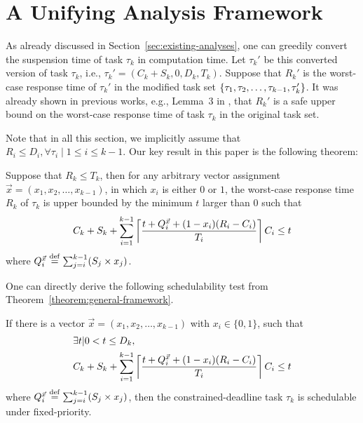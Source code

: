 \section{A Unifying Analysis Framework}
\label{sec:analysis}


As already discussed in Section~\ref{sec:existing-analyses}, one can greedily convert the suspension time of task $\tau_k$ in computation time. Let $\tau_k'$ be this converted version of task $\tau_k$, i.e., $\tau_k' = (C_k + S_k, 0, D_k, T_k)$.  Suppose that $R_k'$ is the worst-case response time of $\tau_k'$ in the modified task set $\left\{{\tau_1, \tau_2, \ldots, \tau_{k-1}, \tau_k'}\right\}$. It was already shown in previous works, e.g., Lemma~3 in
\cite{Liu_2014}, that $R_k'$ is a safe upper bound on the worst-case response time of task $\tau_k$ in the original task set.

Note that in all this section, we implicitly assume that $R_i
\leq D_i, \forall \tau_i \mid 1 \leq i \leq k-1$.  Our key result in
this paper is the following theorem:

\begin{theorem}
   \label{theorem:general-framework}
   Suppose that $R_k \leq T_k$, then for any arbitrary vector assignment $\vec{x} = (x_1, x_2, \ldots, x_{k-1})$, in which $x_i$ is either $0$ or $1$, the worst-case
   response time $R_k$ of $\tau_k$ is upper bounded by the minimum $t$ larger than $0$ such that 
   {\small \begin{equation} \label{eq:TDA-suspension-tighter0} 
       C_k + S_k + \sum_{i=1}^{k-1}\ceiling{\frac{t+Q_i^{\vec{x}}+(1-x_i)(R_i-C_i)}{T_i}} C_i \leq t
     \end{equation}}where $Q_i^{\vec{x}} \stackrel{\mathrm{def}}{=} \sum_{j=i}^{k-1} (S_j \times x_j)$.
 \end{theorem} 
 One can directly derive the
 following schedulability test from Theorem~\ref{theorem:general-framework}.

 \begin{Corollary}
   \label{corollary:general-framework}
   If there is a vector $\vec{x} = (x_1, x_2, \ldots,
   x_{k-1})$ with $x_i \in \{ 0, 1\}$, such that 
   {\small \begin{align} 
   \label{eq:TDA-suspension-tighter} 
       & \exists t | 0 < t \leq D_k,  \nonumber \\
       & C_k + S_k + \sum_{i=1}^{k-1}\ceiling{\frac{t+Q_i^{\vec{x}}+(1-x_i)(R_i-C_i)}{T_i}} C_i \leq t
     \end{align}}
     where $Q_i^{\vec{x}} \stackrel{\mathrm{def}}{=} \sum_{j=i}^{k-1} (S_j \times x_j)$, then the constrained-deadline task $\tau_k$ is schedulable under fixed-priority.
 \end{Corollary}
 
